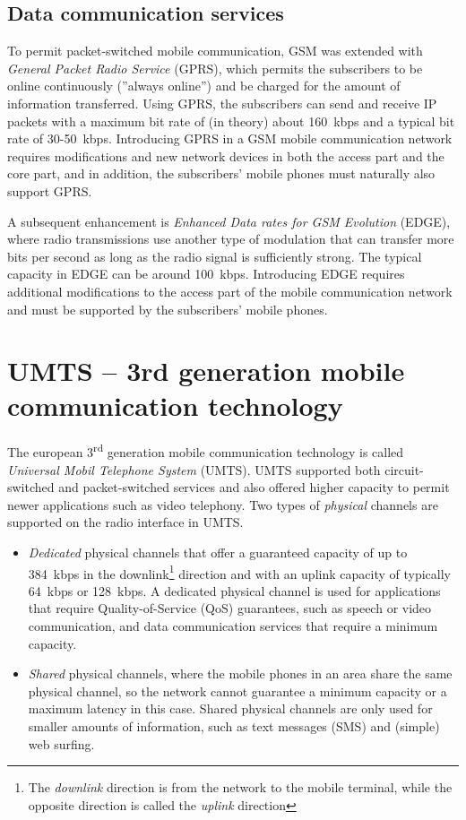 \subsection{Data communication services}
To permit packet-switched mobile communication, GSM was extended with \emph{General Packet Radio Service} (GPRS), which permits the subscribers to be online continuously (''always online'') and be charged for the amount of information transferred. Using GPRS, the subscribers can send and receive IP packets with a maximum bit rate of (in theory) about 160~kbps and a typical bit rate of 30-50~kbps. Introducing GPRS in a GSM mobile communication network requires modifications and new network devices in both the access part and the core part, and in addition, the subscribers' mobile phones must naturally also support GPRS.

A subsequent enhancement is \emph{Enhanced Data rates for GSM Evolution} (EDGE), where radio transmissions use another type of modulation that can transfer more bits per second as long as the radio signal is sufficiently strong. The typical capacity in EDGE can be around 100~kbps. Introducing EDGE requires additional modifications to the access part of the mobile communication network and must be supported by the subscribers' mobile phones.

\section{UMTS -- 3rd generation mobile communication technology}
The european 3\textsuperscript{rd} generation mobile communication technology is called \emph{Universal Mobil Telephone System} (UMTS). UMTS supported both circuit-switched and packet-switched services and also offered higher capacity to permit newer applications such as video telephony. Two types of \emph{physical} channels are supported on the radio interface in UMTS.
\begin{itemize}
%
\item \emph{Dedicated} physical channels that offer a guaranteed capacity of up to 384~kbps in the downlink\footnote{The \emph{downlink} direction is from the network to the mobile terminal, while the opposite direction is called the \emph{uplink} direction} direction and with an uplink capacity of typically 64~kbps or 128~kbps. A dedicated physical channel is used for applications that require Quality-of-Service (QoS) guarantees, such as speech or video communication, and data communication services that require a minimum capacity.
%
\item \emph{Shared} physical channels, where the mobile phones in an area share the same physical channel, so the network cannot guarantee a minimum capacity or a maximum latency in this case. Shared physical channels are only used for smaller amounts of information, such as text messages (SMS) and (simple) web surfing.
%
\end{itemize}

